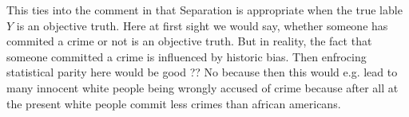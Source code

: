 This ties into the comment in \cite{castelnovo2022} that Separation is appropriate when
the true lable $Y$ is an objective truth. Here at first sight we would say, whether someone
has commited a crime or not is an objective truth. But in reality, the fact that someone committed
a crime is influenced by historic bias.
Then enfrocing statistical parity here would be good ?? No because then this would e.g. lead
to many innocent white people being wrongly accused of crime because after all at the present white people
commit less crimes than african americans.
